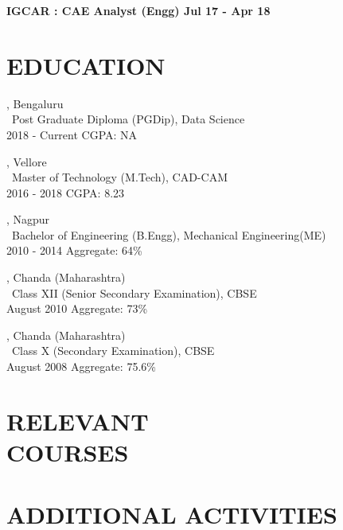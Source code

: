 \documentclass[margin]{res}
\begin{document}
\begin{resume}
\textbf{IGCAR : CAE Analyst (Engg) \hfill{Jul 17 - Apr 18}\\}



\section{EDUCATION}
, Bengaluru\\
{\ Post Graduate Diploma (PGDip)}, Data Science\\
2018 - Current
\hfill CGPA: NA\

, Vellore\\
{\ Master of Technology (M.Tech)}, CAD-CAM\\
2016 - 2018
\hfill CGPA: 8.23\

, Nagpur\\
{\ Bachelor of Engineering (B.Engg)}, Mechanical Engineering(ME)\\
2010 - 2014
\hfill Aggregate: 64\%

, Chanda (Maharashtra) \\
{\ Class XII (Senior Secondary Examination)}, CBSE\\
August 2010
\hfill Aggregate: 73\%

, Chanda (Maharashtra) \\
{\ Class X (Secondary Examination)}, CBSE\\
August 2008
\hfill Aggregate: 75.6\%

\section{RELEVANT\\COURSES}
\par


\section{ADDITIONAL ACTIVITIES}




\end{resume}
\(\)
\end{document}

